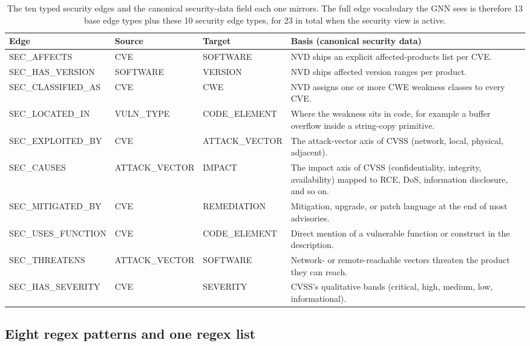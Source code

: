\documentclass[11pt,a4paper]{article}
\begin{document}
\begin{table}[!htbp]
\centering\small
\begin{tabularx}{\linewidth}{l l l X}
\toprule
\textbf{Edge} & \textbf{Source} & \textbf{Target} &
\textbf{Basis (canonical security data)} \\
\midrule
SEC\_AFFECTS         & CVE              & SOFTWARE       &
    NVD ships an explicit affected-products list per CVE. \\
SEC\_HAS\_VERSION    & SOFTWARE         & VERSION        &
    NVD ships affected version ranges per product. \\
SEC\_CLASSIFIED\_AS  & CVE              & CWE            &
    NVD assigns one or more CWE weakness classes to every
    CVE. \\
SEC\_LOCATED\_IN     & VULN\_TYPE       & CODE\_ELEMENT  &
    Where the weakness sits in code, for example a buffer
    overflow inside a string-copy primitive. \\
SEC\_EXPLOITED\_BY   & CVE              & ATTACK\_VECTOR &
    The attack-vector axis of CVSS (network, local,
    physical, adjacent). \\
SEC\_CAUSES          & ATTACK\_VECTOR   & IMPACT         &
    The impact axis of CVSS (confidentiality, integrity,
    availability) mapped to RCE, DoS, information
    disclosure, and so on. \\
SEC\_MITIGATED\_BY   & CVE              & REMEDIATION    &
    Mitigation, upgrade, or patch language at the end of
    most advisories. \\
SEC\_USES\_FUNCTION  & CVE              & CODE\_ELEMENT  &
    Direct mention of a vulnerable function or construct in
    the description. \\
SEC\_THREATENS       & ATTACK\_VECTOR   & SOFTWARE       &
    Network- or remote-reachable vectors threaten the
    product they can reach. \\
SEC\_HAS\_SEVERITY   & CVE              & SEVERITY       &
    CVSS's qualitative bands (critical, high, medium, low,
    informational). \\
\bottomrule
\end{tabularx}
\caption{The ten typed security edges and the canonical
security-data field each one mirrors. The full edge
vocabulary the GNN sees is therefore 13 base edge types
plus these 10 security edge types, for 23 in total when the
security view is active.}
\label{tab:sec-edges}
\end{table}

\subsection{Eight regex patterns and one regex list}
\end{document}
